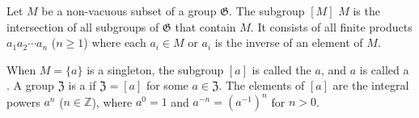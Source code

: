 Let $M$ be a non-vacuous subset of a group $\mathfrak{G}$. The subgroup $[M]$  $M$ is the intersection of all subgroups of $\mathfrak{G}$ that contain $M$. It consists of all finite products $a_1 a_2 \cdots a_n$ ($n \geq 1$) where each $a_i \in M$ or $a_i$ is the inverse of an element of $M$.

When $M = \{a\}$ is a singleton, the subgroup $[a]$ is called the  $a$, and $a$ is called a . A group $\mathfrak{Z}$ is a  if $\mathfrak{Z} = [a]$ for some $a \in \mathfrak{Z}$. The elements of $[a]$ are the integral powers $a^n$ ($n \in \mathbb{Z}$), where $a^0 = 1$ and $a^{-n} = (a^{-1})^n$ for $n > 0$.
